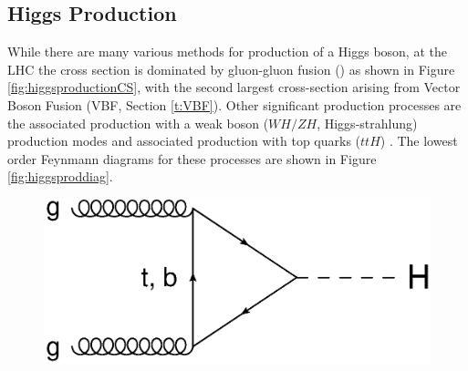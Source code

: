 	\subsection{Higgs Production}

		While there are many various methods for production of a Higgs boson, at the LHC the cross section is dominated by gluon-gluon fusion (\ggF) as shown in Figure \ref{fig:higgsproductionCS}, with the second largest cross-section arising from Vector Boson Fusion (VBF, Section \ref{t:VBF}). Other significant production processes are the associated production with a weak boson ($WH/ZH$, Higgs-strahlung) production modes and associated production with top quarks ($ttH$) \cite{LHCHiggsCS}. The lowest order Feynmann diagrams for these processes are shown in Figure \ref{fig:higgsproddiag}.

			\begin{figure}[h]
				\centering
				\includegraphics[width=0.5\linewidth]{T/FIGS/ggf}
			\end{figure}
